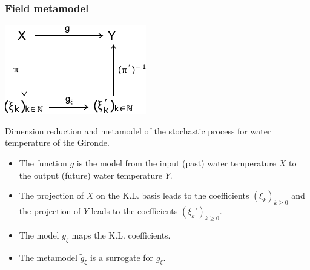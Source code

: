 \documentclass[10pt]{beamer}
\begin{document}


\begin{frame}
\frametitle{Field metamodel}

\begin{center}
\includegraphics[height=0.3\textheight]{figures/metamodele-champ.pdf}
\end{center}

Dimension reduction and metamodel of the stochastic process for water temperature 
of the Gironde. 

\begin{itemize}
\item The function $g$ is the model from the input (past) water temperature $X$ 
to the output (future) water temperature $Y$. 
\item The projection of $X$ on the K.L. basis leads to the coefficients 
$(\xi_k)_{k\geq 0}$ and the projection of $Y$ leads to the coefficients 
$(\xi_k')_{k\geq 0}$. 
\item The model $g_\xi$ maps the K.L. coefficients.
\item The metamodel $\tilde{g}_\xi$ is a surrogate for $g_\xi$.
\end{itemize}

\end{frame}

\end{document}
